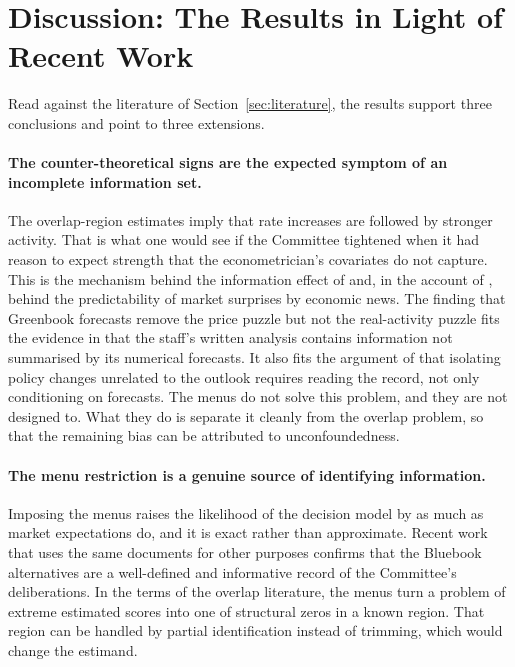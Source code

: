\section{Discussion: The Results in Light of Recent Work}\label{sec:discussion}

Read against the literature of Section~\ref{sec:literature}, the results support three conclusions and point to
three extensions.

\paragraph{The counter-theoretical signs are the expected symptom of an incomplete information set.} The
overlap-region estimates imply that rate increases are followed by stronger activity. That is what one would see if
the Committee tightened when it had reason to expect strength that the econometrician's covariates do not capture.
This is the mechanism behind the information effect of \citet{nakamura2018} and, in the account of
\citet{bauer2023aer}, behind the predictability of market surprises by economic news. The finding that
Greenbook forecasts remove the price puzzle but not the real-activity puzzle fits the evidence in \citet{aruoba2025}
that the staff's written analysis contains information not summarised by its numerical forecasts. It also fits the
argument of \citet{romer2023} that isolating policy changes unrelated to the outlook requires reading the record,
not only conditioning on forecasts. The menus do not solve this problem, and they are not designed to. What they do
is separate it cleanly from the overlap problem, so that the remaining bias can be attributed to unconfoundedness.

\paragraph{The menu restriction is a genuine source of identifying information.} Imposing the menus raises the
likelihood of the decision model by as much as market expectations do, and it is exact rather than approximate.
Recent work that uses the same documents for other purposes \citep{doh2026,laarits2025} confirms that the Bluebook
alternatives are a well-defined and informative record of the Committee's deliberations. In the terms of the overlap
literature, the menus turn a problem of extreme estimated scores \citep{khan2010,heiler2021} into one of
structural zeros in a known region. That region can be handled by partial identification
\citep{susmann2025} instead of trimming, which would change the estimand.

